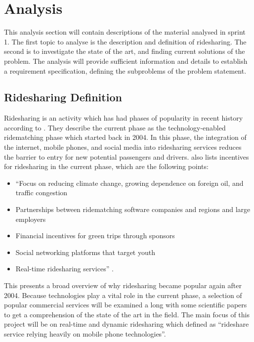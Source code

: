 \section{Analysis}
This analysis section will contain descriptions of the material analysed in sprint 1.
The first topic to analyse is the description and definition of ridesharing.
The second is to investigate the state of the art, and finding current solutions of the problem.
The analysis will provide sufficient information and details to establish a requirement specification, defining the subproblems of the problem statement. 

\subsection{Ridesharing Definition}
Ridesharing is an activity which has had phases of popularity in recent history according to \citet{doi:10.1080/01441647.2011.621557}.
They describe the current phase as the technology-enabled ridematching phase which started back in 2004.
In this phase, the integration of the internet, mobile phones, and social media into ridesharing services reduces the barrier to entry for new potential passengers and drivers.
\citet{doi:10.1080/01441647.2011.621557} also lists incentives for ridesharing in the current phase, which are the following points:

\begin{itemize}
	\item ``Focus on reducing climate change, growing dependence on foreign oil, and traffic congestion
	\item Partnerships between ridematching software companies and regions and large employers
	\item Financial incentives for green trips through sponsors
	\item Social networking platforms that target youth
	\item Real-time ridesharing services'' \citep{doi:10.1080/01441647.2011.621557}.
\end{itemize}

This presents a broad overview of why ridesharing became popular again after 2004.
Because technologies play a vital role in the current phase, a selection of popular commercial services will be examined a	long with some scientific papers to get a comprehension of the state of the art in the field.
The main focus of this project will be on real-time and dynamic ridesharing which \citet{amey2011real} defined as ``rideshare service relying heavily on mobile phone technologies''.

